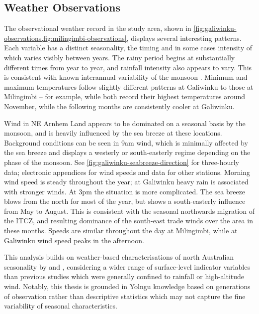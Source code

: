 \subsection{Weather Observations}
\label{ssec:disc-weather}

The observational weather record in the study area, shown in
\cref{fig:galiwinku-observations,fig:milingimbi-observations}, displays
several interesting patterns.  Each variable has a distinct seasonality,
the timing and in some cases intensity of which varies visibly between years.
The rainy period begins at substantially different times from year to year,
and rainfall intensity also appears to vary.  This is consistent with known
interannual variability of the monsoon \citep[eg.][]{cook2001}.
%
Minimum and maximum temperatures follow slightly different patterns at
Galiwinku to those at Milingimbi -- for example, while both record their
highest temperatures around November, while the following months are consistently
cooler at Galiwinku.

Wind in NE Arnhem Land appears to be dominated on a seasonal basis by the
monsoon, and is heavily influenced by the sea breeze at these
locations.  Background conditions can be seen in 9am wind, which is minimally
affected by the sea breeze and displays a westerly or south-easterly regime
depending on the phase of the monsoon.  See \cref{fig:galiwinku-seabreeze-direction}
for three-hourly data; electronic appendices for wind speeds and data for other stations.
Morning wind speed is steady throughout the year; at Galiwinku heavy rain
is associated with stronger winds.
%
At 3pm the situation is more complicated.  The sea breeze blows from the north
for most of the year, but shows a south-easterly influence from May to
August.  This is consistent with the seasonal northwards migration of the ITCZ,
and resulting dominance of the south-east trade winds over the area in these
months.  Speeds are similar throughout the day at Milingimbi, while at Galiwinku
wind speed peaks in the afternoon.


This analysis builds on weather-based characterisations of north Australian
seasonality by \citet{cook2001} and \citet{holland1985}, considering a wider
range of surface-level indicator variables than previous studies which were
generally confined to rainfall or high-altitude wind.  Notably, this thesis
is grounded in Yolngu knowledge based on generations of observation rather than
descriptive statistics which may not capture the fine variability of seasonal
characteristics.



